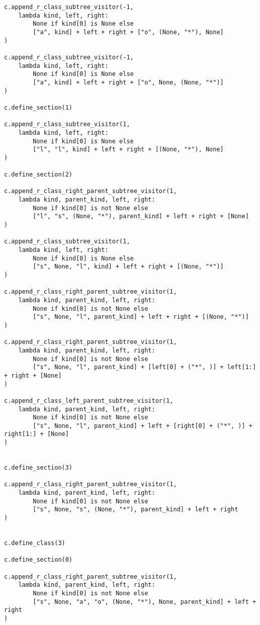 \documentclass[final]{article}
\theoremstyle{definition}
\theoremstyle{definition}
\theoremstyle{remark}
\begin{document}
\begin{lstlisting}
c.append_r_class_subtree_visitor(-1,
    lambda kind, left, right:
        None if kind[0] is None else
        ["a", kind] + left + right + ["o", (None, "*"), None]
)

c.append_r_class_subtree_visitor(-1,
    lambda kind, left, right:
        None if kind[0] is None else
        ["a", kind] + left + right + ["o", None, (None, "*")]
)

c.define_section(1)

c.append_r_class_subtree_visitor(1,
    lambda kind, left, right:
        None if kind[0] is None else
        ["l", "l", kind] + left + right + [(None, "*"), None]
)

c.define_section(2)

c.append_r_class_right_parent_subtree_visitor(1,
    lambda kind, parent_kind, left, right:
        None if kind[0] is not None else
        ["l", "s", (None, "*"), parent_kind] + left + right + [None]
)

c.append_r_class_subtree_visitor(1,
    lambda kind, left, right:
        None if kind[0] is None else
        ["s", None, "l", kind] + left + right + [(None, "*")]
)

c.append_r_class_right_parent_subtree_visitor(1,
    lambda kind, parent_kind, left, right:
        None if kind[0] is not None else
        ["s", None, "l", parent_kind] + left + right + [(None, "*")]
)

c.append_r_class_right_parent_subtree_visitor(1,
    lambda kind, parent_kind, left, right:
        None if kind[0] is not None else
        ["s", None, "l", parent_kind] + [left[0] + ("*", )] + left[1:] + right + [None]
)

c.append_r_class_left_parent_subtree_visitor(1,
    lambda kind, parent_kind, left, right:
        None if kind[0] is not None else
        ["s", None, "l", parent_kind] + left + [right[0] + ("*", )] + right[1:] + [None]
)


c.define_section(3)

c.append_r_class_right_parent_subtree_visitor(1,
    lambda kind, parent_kind, left, right:
        None if kind[0] is not None else
        ["s", None, "s", (None, "*"), parent_kind] + left + right
)


c.define_class(3)

c.define_section(0)

c.append_r_class_right_parent_subtree_visitor(1,
    lambda kind, parent_kind, left, right:
        None if kind[0] is not None else
        ["s", None, "a", "o", (None, "*"), None, parent_kind] + left + right
)


\end{lstlisting}
\end{document}
